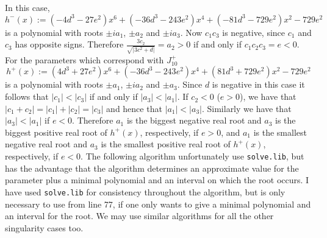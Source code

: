 \documentclass[noend]{amsproc}
\theoremstyle{definition}
\begin{document}
In this case,  
\[h^-(x):=(-4d^3-27e^2)x^6+(-36d^3-243e^2)x^4+(-81d^3-729e^2)x^2-729e^2\]
is a polynomial with roots $\pm i a_1$, $\pm a_2$ and $\pm i a_3$. Now $c_1c_3$ is negative, since $c_1$ and $c_3$ has opposite signs. Therefore $\frac{3c_2}{\sqrt{|3c^2+d|}}=a_2>0$ if and only if $c_1c_2c_3=e<0$. For the parameters which correspond with $J_{10}^+$
 \[h^+(x):=(4d^3+27e^2)x^6+(-36d^3-243e^2)x^4+(81d^3+729e^2)x^2-729e^2\]
is a polynomial with roots $\pm a_1$, $\pm i a_2$ and $\pm a_3$.
Since $d$ is negative in this case it follows that $|c_1|<|c_3|$ if and only if $|a_3|<|a_1|$. If $c_2<0$ ($e>0$), we have that $|c_1+c_2|=|c_1|+|c_2|=|c_3|$ and hence that $|a_1|<|a_3|$. Similarly we have that $|a_3|<|a_1|$ if $e<0$. Therefore $a_1$ is the biggest negative real root and $a_3$ is the biggest positive real root of $h^+(x)$, respectively, if $e>0$, and $a_1$ is the smallest negative real root and $a_3$ is the smallest positive real root of $h^+(x)$, respectively, if $e<0$.  The following algorithm unfortunately use {\tt solve.lib}, but has the advantage that the algorithm determines an approximate value for the parameter plus a minimal polynomial and an interval on which the root occurs. I have used {\tt solve.lib} for consistency throughout the algorithm, but is only necessary to use from line 77, if one only wants to give a minimal polynomial and an interval for the root. We may use similar algorithms for all the other singularity cases too.
\end{document}

